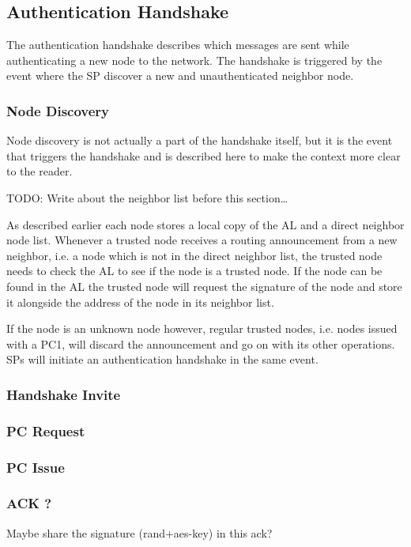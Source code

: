 \subsection{Authentication Handshake}
The authentication handshake describes which messages are sent while
authenticating a new node to the network. The handshake is triggered by the
event where the \ac{SP} discover a new and unauthenticated neighbor node.

\subsubsection*{Node Discovery}
Node discovery is not actually a part of the handshake itself, but it is the
event that triggers the handshake and is described here to make the context more
clear to the reader.

TODO: Write about the neighbor list before this section\ldots

As described earlier each node stores a local copy of the \ac{AL} and a direct
neighbor node list. Whenever a trusted node receives a routing announcement from
a new neighbor, i.e. a node which is not in the direct neighbor list, the
trusted node needs to check the \ac{AL} to see if the node is a trusted node. If
the node can be found in the \ac{AL} the trusted node will request the signature
of the node and store it alongside the address of the node in its neighbor list.

If the node is an unknown node however, regular trusted nodes, i.e. nodes issued
with a \ac{PC1}, will discard the announcement and go on with its other
operations. \acp{SP} will initiate an authentication handshake in the same
event.

\subsubsection*{Handshake Invite}

\subsubsection*{\acf{PC} Request}

\subsubsection*{\acf{PC} Issue}

\subsubsection*{ACK ?}
Maybe share the signature (rand+aes-key) in this ack?



